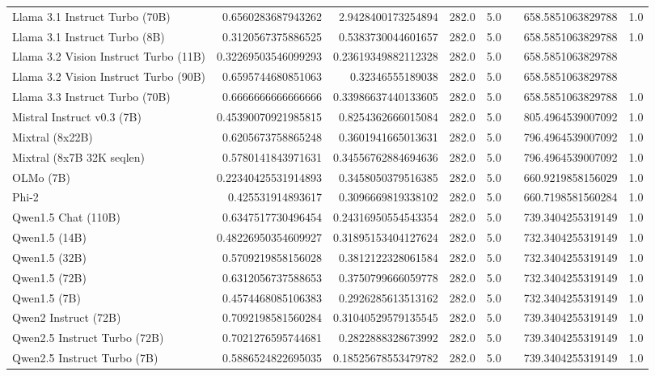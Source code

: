 \begin{table}[htp]
{\begin{tabular}{lrrrrrrr}
Llama 3.1 Instruct Turbo (70B) & 0.6560283687943262 & 2.9428400173254894 & 282.0 & 5.0 &  & 658.5851063829788 & 1.0 \\
Llama 3.1 Instruct Turbo (8B) & 0.3120567375886525 & 0.5383730044601657 & 282.0 & 5.0 &  & 658.5851063829788 & 1.0 \\
Llama 3.2 Vision Instruct Turbo (11B) & 0.32269503546099293 & 0.23619349882112328 & 282.0 & 5.0 &  & 658.5851063829788 &  \\
Llama 3.2 Vision Instruct Turbo (90B) & 0.6595744680851063 & 0.32346555189038 & 282.0 & 5.0 &  & 658.5851063829788 &  \\
Llama 3.3 Instruct Turbo (70B) & 0.6666666666666666 & 0.33986637440133605 & 282.0 & 5.0 &  & 658.5851063829788 & 1.0 \\
Mistral Instruct v0.3 (7B) & 0.45390070921985815 & 0.8254362666015084 & 282.0 & 5.0 &  & 805.4964539007092 & 1.0 \\
Mixtral (8x22B) & 0.6205673758865248 & 0.3601941665013631 & 282.0 & 5.0 &  & 796.4964539007092 & 1.0 \\
Mixtral (8x7B 32K seqlen) & 0.5780141843971631 & 0.34556762884694636 & 282.0 & 5.0 &  & 796.4964539007092 & 1.0 \\
OLMo (7B) & 0.22340425531914893 & 0.3458050379516385 & 282.0 & 5.0 &  & 660.9219858156029 & 1.0 \\
Phi-2 & 0.425531914893617 & 0.3096669819338102 & 282.0 & 5.0 &  & 660.7198581560284 & 1.0 \\
Qwen1.5 Chat (110B) & 0.6347517730496454 & 0.24316950554543354 & 282.0 & 5.0 &  & 739.3404255319149 & 1.0 \\
Qwen1.5 (14B) & 0.48226950354609927 & 0.31895153404127624 & 282.0 & 5.0 &  & 732.3404255319149 & 1.0 \\
Qwen1.5 (32B) & 0.5709219858156028 & 0.3812122328061584 & 282.0 & 5.0 &  & 732.3404255319149 & 1.0 \\
Qwen1.5 (72B) & 0.6312056737588653 & 0.3750799666059778 & 282.0 & 5.0 &  & 732.3404255319149 & 1.0 \\
Qwen1.5 (7B) & 0.4574468085106383 & 0.2926285613513162 & 282.0 & 5.0 &  & 732.3404255319149 & 1.0 \\
Qwen2 Instruct (72B) & 0.7092198581560284 & 0.31040529579135545 & 282.0 & 5.0 &  & 739.3404255319149 & 1.0 \\
Qwen2.5 Instruct Turbo (72B) & 0.7021276595744681 & 0.2822888328673992 & 282.0 & 5.0 &  & 739.3404255319149 & 1.0 \\
Qwen2.5 Instruct Turbo (7B) & 0.5886524822695035 & 0.18525678553479782 & 282.0 & 5.0 &  & 739.3404255319149 & 1.0 \\

\end{tabular}}
\end{table}
